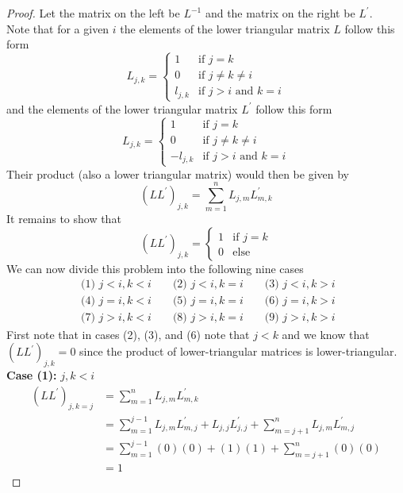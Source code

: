 \documentclass[12pt]{article}
\begin{document}
	\begin{proof}Let the matrix on the left be $L^{-1}$ and the matrix on the right be $L^\prime$. \\
		Note that for a given $i$ the elements of the lower triangular matrix $L$ follow this form
		$$
		L_{j,k} =
		\begin{cases}
			1 & \text{if } j=k \\
			0 & \text{if } j \neq k \neq i \\
			l_{j,k} & \text{if } j > i \text{ and } k = i
		\end{cases}
		$$
		and the elements of the lower triangular matrix $L^\prime$ follow this form
		$$
		L_{j,k} =
		\begin{cases}
		1 & \text{if } j=k \\
		0 & \text{if } j \neq k \neq i \\
		-l_{j,k} & \text{if } j > i \text{ and } k = i
		\end{cases}
		$$
		Their product (also a lower triangular matrix) would then be given by
		$$
		(LL^\prime)_{j,k} = \sum\limits_{m=1}^n L_{j,m}L^\prime_{m,k}
		$$
		It remains to show that
		$$
		(LL^\prime)_{j,k} =
		\begin{cases}
			1 & \text{if } j=k \\
			0 & \text{else}
		\end{cases}
		$$
		We can now divide this problem into the following nine cases
		\begin{align*}
			\text{ (1) } j<i, k < i && \text{ (2) } j<i, k=i && \text{ (3) } j<i, k>i \\
			\text{ (4) } j=i, k < i && \text{ (5) } j=i, k=i && \text{ (6) } j=i, k>i \\
			\text{ (7) } j>i, k < i && \text{ (8) } j>i, k=i && \text{ (9) } j>i, k>i
		\end{align*}
		First note that in cases (2), (3), and (6) note that $j<k$ and we know that $(LL^\prime)_{j,k} = 0$ since the product of lower-triangular matrices is lower-triangular.
		\textbf{Case (1):} $j,k<i$
		\begin{align*}
			(LL^\prime)_{j,k=j} & = \sum\limits_{m=1}^n L_{j,m}L^\prime_{m,k} \\
			& = \sum\limits_{m=1}^{j-1} L_{j,m}L^\prime_{m,j} + L_{j,j}L^\prime_{j,j} + \sum\limits_{m=j+1}^n L_{j,m}L^\prime_{m,j} \\
			& = \sum\limits_{m=1}^{j-1} (0)(0) + (1)(1) + \sum\limits_{m=j+1}^n (0)(0) \\
			& = 1
		\end{align*}

\end{proof}
\end{document}
